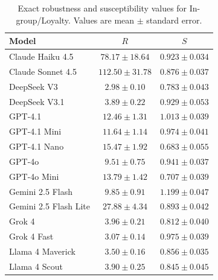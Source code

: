 \begin{table}[p!]
  \centering
  \caption{Exact robustness and susceptibility values for In-group/Loyalty. Values are mean $\pm$ standard error.}
  \label{tab:metric_values_in_group_loyalty}
  \small
  \begin{tabular}{lcc}
    \toprule
    Model & $R$ & $S$ \\
    \midrule
    Claude Haiku 4.5 & $78.17 \pm 18.64$ & $0.923 \pm 0.034$ \\
    Claude Sonnet 4.5 & $112.50 \pm 31.78$ & $0.876 \pm 0.037$ \\
    DeepSeek V3 & $2.98 \pm 0.10$ & $0.783 \pm 0.043$ \\
    DeepSeek V3.1 & $3.89 \pm 0.22$ & $0.929 \pm 0.053$ \\
    GPT-4.1 & $12.46 \pm 1.31$ & $1.013 \pm 0.039$ \\
    GPT-4.1 Mini & $11.64 \pm 1.14$ & $0.974 \pm 0.041$ \\
    GPT-4.1 Nano & $15.47 \pm 1.92$ & $0.683 \pm 0.055$ \\
    GPT-4o & $9.51 \pm 0.75$ & $0.941 \pm 0.037$ \\
    GPT-4o Mini & $13.79 \pm 1.42$ & $0.707 \pm 0.039$ \\
    Gemini 2.5 Flash & $9.85 \pm 0.91$ & $1.199 \pm 0.047$ \\
    Gemini 2.5 Flash Lite & $27.88 \pm 4.34$ & $0.893 \pm 0.042$ \\
    Grok 4 & $3.96 \pm 0.21$ & $0.812 \pm 0.040$ \\
    Grok 4 Fast & $3.07 \pm 0.14$ & $0.975 \pm 0.039$ \\
    Llama 4 Maverick & $3.50 \pm 0.16$ & $0.856 \pm 0.035$ \\
    Llama 4 Scout & $3.90 \pm 0.25$ & $0.845 \pm 0.045$ \\
    \bottomrule
  \end{tabular}
\end{table}

